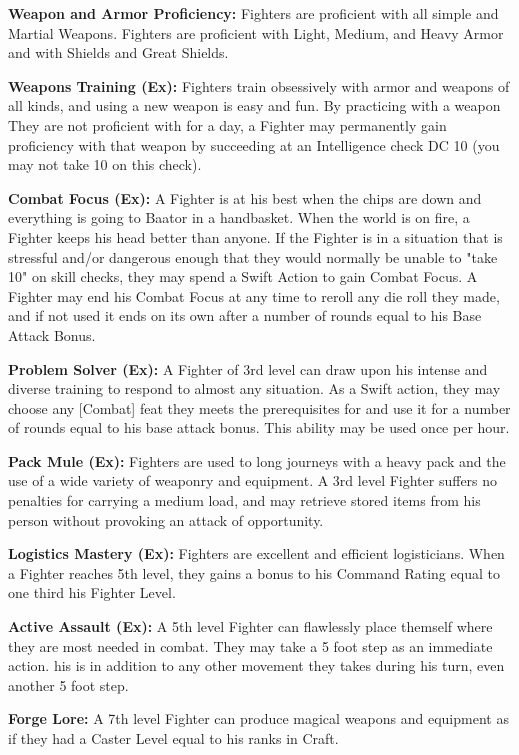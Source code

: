 \textbf{Weapon and Armor Proficiency:} Fighters are proficient with all simple and Martial Weapons. Fighters are proficient with Light, Medium, and Heavy Armor and with Shields and Great Shields.

\textbf{Weapons Training (Ex):} Fighters train obsessively with armor and weapons of all kinds, and using a new weapon is easy and fun. By practicing with a weapon They are not proficient with for a day, a Fighter may permanently gain proficiency with that weapon by succeeding at an Intelligence check DC 10 (you may not take 10 on this check).

\textbf{Combat Focus (Ex):} A Fighter is at his best when the chips are down and everything is going to Baator in a handbasket. When the world is on fire, a Fighter keeps his head better than anyone. If the Fighter is in a situation that is stressful and/or dangerous enough that they would normally be unable to "take 10" on skill checks, they may spend a Swift Action to gain Combat Focus. A Fighter may end his Combat Focus at any time to reroll any die roll they made, and if not used it ends on its own after a number of rounds equal to his Base Attack Bonus.

\textbf{Problem Solver (Ex):} A Fighter of 3rd level can draw upon his intense and diverse training to respond to almost any situation. As a Swift action, they may choose any [Combat] feat they meets the prerequisites for and use it for a number of rounds equal to his base attack bonus. This ability may be used once per hour.

\textbf{Pack Mule (Ex):} Fighters are used to long journeys with a heavy pack and the use of a wide variety of weaponry and equipment. A 3rd level Fighter suffers no penalties for carrying a medium load, and may retrieve stored items from his person without provoking an attack of opportunity.

\textbf{Logistics Mastery (Ex):} Fighters are excellent and efficient logisticians. When a Fighter reaches 5th level, they gains a bonus to his Command Rating equal to one third his Fighter Level.

\textbf{Active Assault (Ex):} A 5th level Fighter can flawlessly place themself where they are most needed in combat. They may take a 5 foot step as an immediate action. his is in addition to any other movement they takes during his turn, even another 5 foot step.

\textbf{Forge Lore:} A 7th level Fighter can produce magical weapons and equipment as if they had a Caster Level equal to his ranks in Craft.

